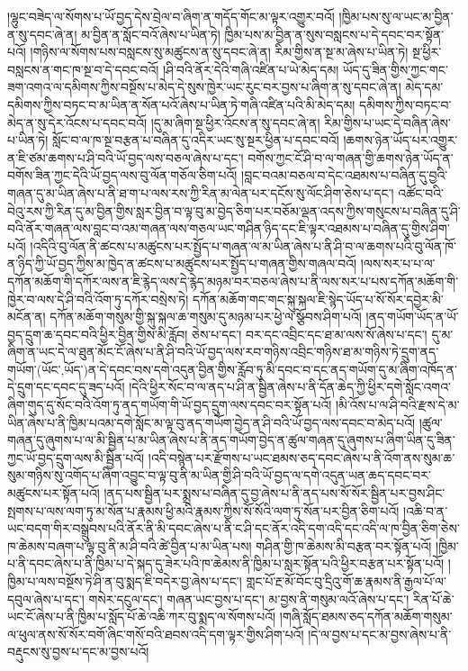 །ལྷུང་བཟེད་ལ་སོགས་པ་ཡོ་བྱད་དེས་བྲེལ་བ་ཞིག་ན་གདོད་གོང་མ་ལྟར་འགྱུར་བའོ། །ཁྱིམ་པས་སུ་ལ་ཡང་མ་བྱིན་ན་སུ་དབང་ཞེ་ན། མ་བྱིན་ན་སློང་བའོ་ཞེས་པ་ཡིན་ཏེ། ཁྱིམ་པས་མ་བྱིན་ན་སུས་བསླངས་པ་དེ་དབང་བར་སྟོན་པའོ། །གཉིས་ལ་སོགས་པས་བསླངས་སུ་མཚུངས་ན་སུ་དབང་ཞེ་ན། རིམ་གྱིས་ན་སྔ་མ་ཞེས་པ་ཡིན་ཏེ། སྔ་ཕྱིར་བསླངས་ན་གང་ཁ་སྔ་བ་དེ་དབང་བའོ། །ཤི་བའི་ནོར་དེའི་གཞི་འཛིན་པ་ཡེ་མེད་དམ། ཡོད་དུ་ཟིན་གྱིས་ཀྱང་གང་ཟག་འགའ་ལ་དམིགས་ཀྱིས་བསྔོས་པ་མེད་དེ་སུས་ཁྱེར་ཡང་རུང་བར་བྱས་པ་ཞིག་ན་སུ་དབང་ཞེ་ན། མེད་དམ་དམིགས་ཀྱིས་བཏང་བ་མ་ཡིན་ན་སོན་པའོ་ཞེས་པ་ཡིན་ཏེ་གཞི་འཛིན་པའི་མི་མེད་དམ། དམིགས་ཀྱིས་བཏང་བ་མེད་ན་སུ་དེར་འོངས་པ་དབང་བའོ། །དུ་མ་ཞིག་སྔ་ཕྱིར་འོངས་ན་སུ་དབང་ཞེ་ན། རིམ་གྱིས་པ་ཡང་དེ་བཞིན་ཞེས་པ་ཡིན་ཏེ། སློང་བ་ལ་ཁ་སྔ་བརྩན་པ་བཞིན་དུ་འདིར་ཡང་སུ་སྔར་ཕྱིན་པ་དབང་བའོ། །ཆགས་ཉེན་ཡོད་པར་འགྱུར་ན་ཇི་ཙམ་ཆགས་པ་ཤི་བའི་ཡོ་བྱད་ལས་བཅལ་ཞེས་པ་དང་། བགོས་ཀྱང་ངོ་ཤི་བ་ལ་གཞན་གྱི་ཆགས་ཉེན་ཡོད་ན་བགོས་ཟིན་ཀྱང་དེའི་ཡོ་བྱད་ལས་བུ་ལོན་གཅོལ་ཅིག་པའོ། །བླང་བའམ་བཅལ་བ་དེང་འཐམས་པ་བཞིན་དུ་བྱའི་གཞན་དུ་མ་ཡིན་ཞེས་པ་ནི་ཐ་ག་པ་ལས་རས་ཀྱི་རིན་མ་ལེན་པར་དངོས་སུ་ལོང་ཤིག་ཅེས་པ་དང་། འཚོང་བའི་བེའུ་རས་ཀྱི་རིན་དུ་མ་བྱིན་གྱིས་སླར་བྱིན་བ་ལྟ་བུ་མ་བྱེད་ཅིག་པར་བཅོམ་ལྡན་འདས་ཀྱིས་གསུངས་པ་བཞིན་དུ་ཤི་བའི་ནོར་གཞན་ལས་བླང་བ་འམ་གཞན་ལས་གཅལ་ཡང་གཤིན་ཉིད་དང་ཇི་ལྟར་འཐམས་པ་བཞིན་དུ་གྱིས་ཤིག་པའོ། །འདིའི་བུ་ལོན་ནི་ཚངས་པ་མཚུངས་པར་སྤྱོད་པ་གཞན་ལ་མ་ཡིན་ཞེས་པ་ནི་ཤི་བ་ལ་ཆགས་པའི་བུ་ལོན་ཁོ་ན་ཉིད་ཀྱི་ཡོ་བྱད་ཀྱིས་མ་ཁྱེད་ན་ཚངས་པ་མཚུངས་པར་སྤྱོད་པ་གཞན་གྱིས་གཞལ་བའོ། །ལས་སར་པ་པ་ལ་དཀོན་མཆོག་གི་དཀོར་ལས་ན་ཇི་རྙེད་ལས་དེ་རྙེད་མཉམ་བར་བཅལ་ཞེས་པ་ནི་ལས་སར་པ་པས་དཀོན་མཆོག་གི་ཁྱེར་བ་ལས་དེ་ཤི་བའི་འོག་ཏུ་དཀོར་བསྲེས་ཏེ། དཀོན་མཆོག་གང་གང་སྐུ་སྐལ་ཇི་སྙེད་ཡོད་པ་སོ་སོར་དབྱེར་མི་མངོན་ན། དཀོན་མཆོག་གསུམ་གྱི་སྐུ་སྐལ་ཆ་གསུམ་དུ་མཉམ་པར་ཕྱེ་ལ་སྩོབས་ཤིག་པའོ། །ནད་གཡོག་ཡོད་ན་ཡོ་བྱད་དྲུག་ཆ་དབང་བའི་ཕྱིར་བྱིན་གྱིས་མི་རློབ། ཅེས་པ་དང་། བར་དང་འབྲིང་དང་ཐ་མ་ལས་སོ་ཞེས་པ་དང་། དུ་མ་ཞིག་ན་ཡང་དེ་ལ་ཐུན་མོང་ངོ་ཞེས་པ་ནི་ཤི་བའི་ཡོ་བྱད་ལས་རབ་གཉིས་འབྲིང་གཉིས་ཐ་མ་གཉིས་ཏེ་དྲུག་ནད་གཡོག་(ཡོང་‚ཡོད་)ན་དེ་དབང་བས་དགེ་འདུན་བྱིན་གྱིས་རློབ་ཏུ་མི་དབང་བ་དང་ནད་གཡོག་དུ་མ་ཞིག་འཁོད་ན་དེ་དྲུག་དང་དབང་དུ་ཟད་པའོ། །དེའི་ཕྱིར་སོང་བ་ལ་ནད་པ་ཤི་ན་སྦྱིན་ཞེས་པ་ནི་དོན་ཆེད་ཀྱི་ཕྱིར་དགེ་སློང་འགའ་ཞིག་གུད་དུ་སོང་བའི་འོག་ཏུ་ནད་གཡོག་གི་ཡོ་བྱད་དྲུག་ལས་དབང་བར་སྟོན་པའོ། །མི་འོས་པ་ལ་ཤི་བའི་རྫས་དེ་མ་ཡིན་ཞེས་པ་ནི་ཁྱིམ་པའམ་དགེ་སློང་མ་ལྟ་བུ་ནད་གཡོག་བྱེད་ན་ཤི་བའི་ཡོ་བྱད་ལས་དབང་བ་མེད་པའོ། །ཚུལ་གཞན་དུ་ཞུགས་པ་ལ་མི་སྦྱིན་པ་མ་ཡིན་ཞེས་པ་ནི་ནད་གཡོག་བྱེད་ན་ཚུལ་གཞན་དུ་ཞུགས་པ་ཞིག་ཡིན་དུ་ཟིན་ཀྱང་ཡོ་བྱད་དྲུག་ལས་མི་སྦྱིན་པའོ། །འདི་བསྙེན་པར་རྫོགས་པ་ཡང་ཐམས་ཅད་དབང་ཞེས་པ་ནི་འོག་ནས་སུམ་ཆ་སུམ་གཉིས་སུ་འགོད་པ་ཞིག་འབྱུང་བ་ལྟ་བུ་ནི་མ་ཡིན་གྱི་ཤི་བའི་ཡོ་བྱད་ལ་དགེ་འདུན་ཡན་ཆད་དབང་བར་མཚུངས་པར་སྟོན་པའོ། །ནད་པས་སྦྱིན་པར་སྨྲས་པ་བཞིན་དུ་བྱ་ཞེས་པ་ནི་ནད་པས་སོ་སོར་སྦྱིན་པར་བྱས་ཤིང་སྤགས་པ་ལས་ལག་ཏུ་མ་སོན་པ་རྣམས་ཕྱི་མའི་རྣམས་ཀྱིས་སོ་སོའི་ལག་ཏུ་སོན་པར་བྱིན་ཅིག་པའོ། །འཆི་བ་ན་ཡང་བདག་གིར་བསྒྲུབས་པའི་ནོར་ནི་མི་དབང་ཞེས་པ་ནི་ང་ཤི་དང་ནོར་འདི་དག་འདི་དང་འདི་ལ་ཁ་བྱིན་ཅིག་ཅེས་ཁ་ཆེམས་བཞག་པ་ལྟ་བུ་ནི་མ་ཤི་བའི་ཚེ་བྱིན་པ་མ་ཡིན་པས། གཤིན་གྱི་ཁ་ཆེམས་མི་བརྩན་བར་སྟོན་པའོ། །ཁྱིམ་པ་ནི་དབང་ཞེས་པ་ནི་ཁྱིམ་པ་དེ་སྐད་དུ་ཟེར་པའི་ཁ་ཆེམས་ནི་ཁྱིམ་པ་སླར་སྟོན་པའི་ཕྱིར་བརྩན་པར་སྟོན་པའོ། །ཁྱིམ་པ་ལས་བསྔོས་ཏེ་ཤི་ན་བུ་སྨད་ཇི་བདེར་བྱ་ཞེས་པ་དང་། གླང་པོ་རྔ་མོ་བོང་བུ་དྲིའུ་གོ་ཆ་རྣམས་ནི་རྒྱལ་པོ་ལ་དབུལ་ཞེས་པ་དང་། གསེར་དངུལ་དང་། གཞན་ཡང་བྱས་པ་དང་། མ་བྱས་ནི་གསུམ་ལའོ་ཞེས་པ་དང་། རིན་པོ་ཆེ་ཡང་ངོ་ཞེས་པ་ནི་ཁྱིམ་པ་སློད་པོ་ཆེ་འཆི་ཀར་བུ་སྨད་ལ་སོགས་པའོ། །གཞི་སློད་ཐམས་ཅད་དཀོན་མཆོག་གསུམ་ལ་ཕུལ་ནས་སོ་སོར་བགོ་ཞིང་གསོ་བའི་ཐབས་འདི་དག་ལྟར་གྱིས་ཤིག་པའོ། །དེ་ལ་བྱས་པ་དང་མ་བྱས་ཞེས་པ་ནི་བརྡུངས་སུ་བྱས་པ་དང་མ་བྱས་པའོ། 
